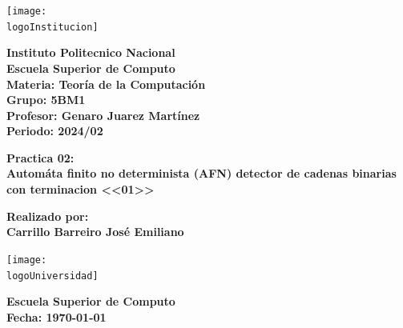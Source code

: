 \documentclass{article}
\newcommand{\logoInstitucion}{logotipo_ipn.png} %
\newcommand{\logoUniversidad}{EscudoESCOM.png} %
\newcommand{\nombreInstituto}{Instituto Politecnico Nacional}
\newcommand{\facultad}{Escuela Superior de Computo}
\newcommand{\materia}{Teoría de la Computación}
\newcommand{\grupo}{5BM1}
\newcommand{\profesora}{Genaro Juarez Martínez}
\newcommand{\periodo}{2024/02}
\newcommand{\alumno}{Carrillo Barreiro José Emiliano}
\begin{document}
\begin{titlepage}
    \begin{center}
        \vspace*{1cm}

        \texttt{[image: \\logoInstitucion]}

        \vspace{1cm}

        \textbf{\LARGE \nombreInstituto} \\
        \textbf{\Large \facultad} \\
        \vspace{0.5cm}
        \textbf{\large Materia: \materia} \\
        \textbf{\large Grupo: \grupo} \\
        \vspace{0.5cm}
        \textbf{\large Profesor: \profesora} \\
        \textbf{\large Periodo: \periodo} \\

        \vspace{1cm}

        \textbf{\LARGE Practica 02:} \\
        \vspace{0.5cm}
        \textbf{\Large Automáta finito no determinista (AFN) detector de cadenas binarias con terminacion <<01>>} \\

        \vfill

        \textbf{\large Realizado por:} \\
        \textbf{\large \alumno}

        \vspace{1cm}

        \texttt{[image: \\logoUniversidad]}

        \vspace{1cm}

        \textbf{\large \facultad} \\
        \textbf{\large Fecha: \today}

    \end{center}
\end{titlepage}

\tableofcontents
\newpage
\listofcpplistings%
\listofmatlablistings%
\listoffigures
\newpage
\end{document}
